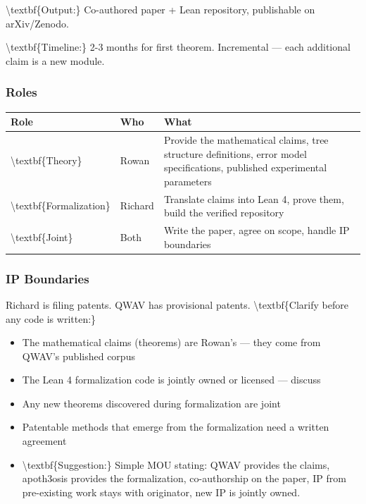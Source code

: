 \documentclass[11pt,a4paper]{article}
\begin{document}
\textbackslash{}textbf\{Output:\} Co-authored paper + Lean repository, publishable on arXiv/Zenodo.

\textbackslash{}textbf\{Timeline:\} 2-3 months for first theorem. Incremental  --- each additional claim is a new module.

\subsubsection{Roles}


\begin{tabular}{|l|l|l|}
\hline
\textbf{Role} & \textbf{Who} & \textbf{What} \\
\hline
\textbackslash{}textbf\{Theory\} & Rowan & Provide the mathematical claims, tree structure definitions, error model specifications, published experimental parameters \\
\hline
\textbackslash{}textbf\{Formalization\} & Richard & Translate claims into Lean 4, prove them, build the verified repository \\
\hline
\textbackslash{}textbf\{Joint\} & Both & Write the paper, agree on scope, handle IP boundaries \\
\hline
\end{tabular}


\subsubsection{IP Boundaries}


Richard is filing patents. QWAV has provisional patents. \textbackslash{}textbf\{Clarify before any code is written:\}

\begin{itemize}
\item The mathematical claims (theorems) are Rowan's  --- they come from QWAV's published corpus
\item The Lean 4 formalization code is jointly owned or licensed  --- discuss
\item Any new theorems discovered during formalization are joint
\item Patentable methods that emerge from the formalization need a written agreement
\item \textbackslash{}textbf\{Suggestion:\} Simple MOU stating: QWAV provides the claims, apoth3osis provides the formalization, co-authorship on the paper, IP from pre-existing work stays with originator, new IP is jointly owned.
\end{itemize}
\end{document}
